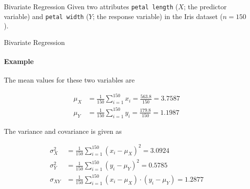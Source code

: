 %
%
\begin{frame}{Bivariate Regression}
    Given two attributes {\tt petal length} ($X$; the predictor variable) and 
    {\tt petal width} ($Y$; the response variable) in the
    Iris dataset ($n=150$). %
\begin{center}
    \centering
{}
\end{center}
\end{frame}

\begin{frame}{Bivariate Regression}
\framesubtitle{Example}

    The mean values for these two variables are
\begin{small}
    \begin{align*}
        \mu_X & = \frac{1}{150} \sum_{i=1}^{150} x_i = \frac{563.8}{150} =
        3.7587\\
        \mu_Y & = \frac{1}{150} \sum_{i=1}^{150} y_i = \frac{179.8}{150} =
        1.1987
    \end{align*}
\end{small}
    The variance and covariance is given as
\begin{small}
    \begin{align*}
        \sigma_X^2 & = \frac{1}{150} \sum_{i=1}^{150} (x_i - \mu_X)^2  =
        3.0924\\
        \sigma_Y^2 & = \frac{1}{150} \sum_{i=1}^{150} (y_i - \mu_Y)^2  =
        0.5785\\
        \sigma_{XY} & = \frac{1}{150} \sum_{i=1}^{150} (x_i -
        \mu_X)\cdot (y_i - \mu_Y)  = 1.2877
    \end{align*}
\end{small}
\end{frame}

